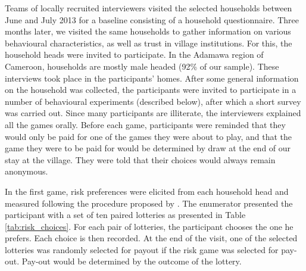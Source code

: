 Teams of locally recruited interviewers visited the selected households between June and July 2013 for a baseline consisting of a household questionnaire. Three months later, we visited the same households to gather information on various behavioural characteristics, as well as trust in village institutions. For this, the household heads were invited to participate. In the Adamawa region of Cameroon, households are mostly male headed (92\% of our sample). These interviews took place in the participants’ homes. After some general information on the household was collected, the participants were invited to participate in a number of behavioural experiments (described below), after which a short survey was carried out. Since many participants are illiterate, the interviewers explained all the games orally. Before each game, participants were reminded that they would only be paid for one of the games they were about to play, and that the game they were to be paid for would be determined by draw at the end of our stay at the village. They were told that their choices would always remain anonymous. 

In the first game, risk preferences were elicited from each household head and measured following the procedure proposed by \cite{Holt2002}. The enumerator presented the participant with a set of ten paired lotteries as presented in Table \ref{tab:risk_choices}. For each pair of lotteries, the participant chooses the one he prefers. Each choice is then recorded. At the end of the visit, one of the selected lotteries was randomly selected for payout if the risk game was selected for pay-out. Pay-out would be determined by the outcome of the lottery.

